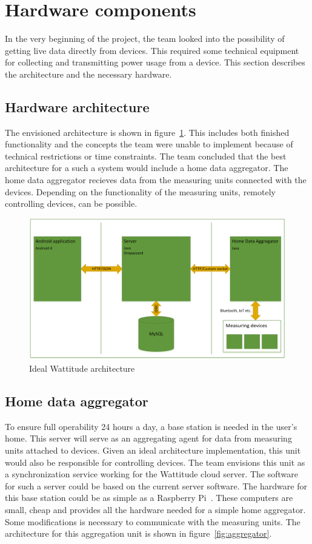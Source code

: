 \section{Hardware components}
\label{sec:hardwareComponents}
In the very beginning of the project, the team looked into the possibility of getting live data directly from devices. This required some technical equipment for collecting and transmitting power usage from a device. This section describes the architecture and the necessary hardware.

\subsection{Hardware architecture}

The envisioned architecture is shown in figure~\ref{fig:idealArchitecture}. This includes both finished functionality and the concepts the team were unable to implement because of technical restrictions or time constraints. The team concluded that the best architecture for a such a system would include a home data aggregator. The home data aggregator recieves data from the measuring units connected with the devices. Depending on the functionality of the measuring units, remotely controlling devices, can be possible.

\begin{figure}[H]
\centering
\includegraphics[height=0.3\textheight]{ch/further/fig/architecture.png}
\caption{Ideal Wattitude architecture}
\label{fig:idealArchitecture}
\end{figure}


\subsection{Home data aggregator}
To ensure full operability 24 hours a day, a base station is needed in the user's home. This server will serve as an aggregating agent for data from measuring units attached to devices. Given an ideal architecture implementation, this unit would also be responsible for controlling devices. The team envisions this unit as a synchronization service working for the Wattitude cloud server. The software for such a server could be based on the current server software. The hardware for this base station could be as simple as a Raspberry Pi~\cite{pi}. These computers are small, cheap and provides all the hardware needed for a simple home aggregator. Some modifications is necessary to communicate with the measuring units. The architecture for this aggregation unit is shown in figure~\ref{fig:aggregator}.

